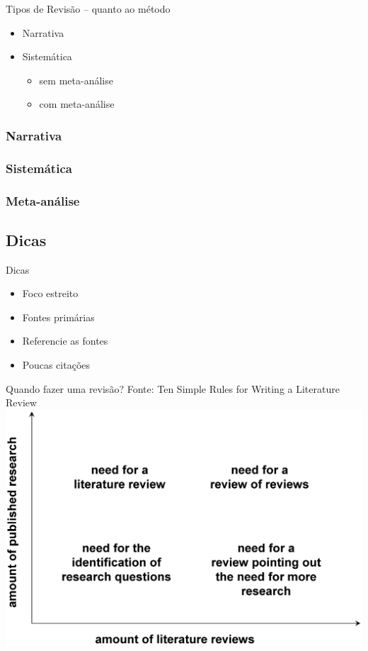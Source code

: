 \documentclass{beamer}
\begin{document}
\begin{frame}{Tipos de Revisão -- quanto ao método}
  \begin{itemize}
    \footnotesize
  \item Narrativa
    \bigskip
  \item Sistemática
    \begin{itemize}
      \scriptsize
      \medskip
    \item sem meta-análise
      \smallskip
    \item com meta-análise
    \end{itemize}
  \end{itemize}
\end{frame}

\subsubsection{Narrativa}

\subsubsection{Sistemática}

\subsubsection{Meta-análise}

\subsection{Dicas}

\begin{frame}{Dicas}
  \begin{itemize}
  \item Foco estreito
  \item Fontes primárias
  \item Referencie as fontes
  \item Poucas citações
  \end{itemize}
\end{frame}

\begin{frame}{Quando fazer uma revisão?}
Fonte: Ten Simple Rules for Writing a Literature Review
  \includegraphics[height=0.8\textheight]{Revisao_resumo/10_dicas_revisao}
\end{frame}
\end{document}

